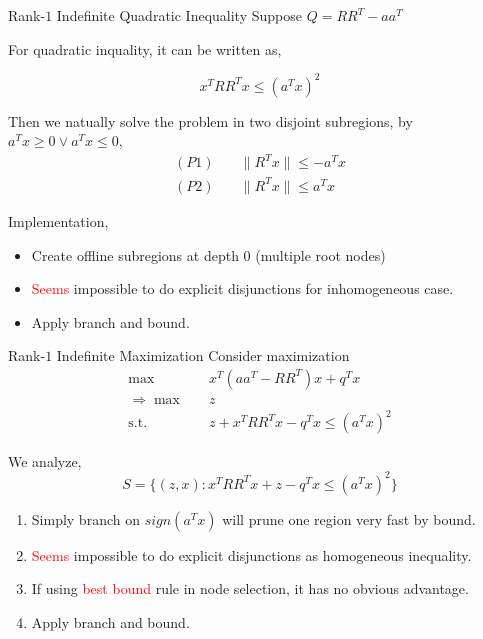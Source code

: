 \documentclass[aspectratio=1610, 10pt]{beamer}
\newcommand{\st}{\mathrm{s.t.\;}}
\newcommand{\red}[1]{\textcolor{red}{#1}}
\begin{document}
\begin{frame}[allowframebreaks]{Rank-\(1\) Indefinite Quadratic Inequality}
  Suppose \(Q = RR^T - aa^T\)

  For quadratic inquality,  it can be written as,

  \begin{equation*}
    x^TRR^Tx \le (a^Tx)^2
  \end{equation*}

  Then we natually solve the problem in two disjoint subregions, by \(a^Tx \ge 0 \vee  a^Tx \le 0 \),
  \begin{align*}
    (P1) \quad & \|R^Tx\| \le - a^Tx \\
    (P2) \quad & \|R^Tx\| \le a^Tx
  \end{align*}

  Implementation,
  \begin{itemize}
    \item Create offline subregions at depth 0 (multiple root nodes)
    \item \red{Seems} impossible to do explicit disjunctions for inhomogeneous case.
    \item Apply branch and bound.
  \end{itemize}

\end{frame}
\begin{frame}[allowframebreaks]{Rank-\(1\) Indefinite Maximization}
  Consider maximization
  \begin{align*}
    \max \quad             & x^T(aa^T-RR^T)x + q^Tx           \\
    \Rightarrow \max \quad & z                                \\
    \st \quad              & z + x^TRR^Tx - q^Tx \le (a^Tx)^2
  \end{align*}

  We analyze,
  \begin{equation*}
    S = \{(z, x): x^TRR^Tx + z - q^Tx \le (a^Tx)^2\}
  \end{equation*}

  \begin{enumerate}
    \item Simply branch on \(sign(a^Tx)\) will prune one region very fast by bound.
    \item \red{Seems} impossible to do explicit disjunctions as homogeneous inequality.
    \item If using \red{best bound} rule in node selection, it has no obvious advantage.
    \item Apply branch and bound.
  \end{enumerate}
  \framebreak
\end{frame}
\end{document}
